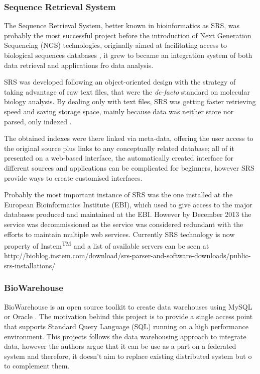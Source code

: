 \subsubsection{Sequence Retrieval System}
The Sequence Retrieval System, better known in bioinformatics as SRS, was probably the most successful project before the introduction of Next Generation Sequencing (NGS) technologies, originally aimed at facilitating access to biological sequences databases \cite{ETZ1996}, it grew to became an integration system of both data retrieval and applications fro data analysis.

SRS was developed following an object-oriented design with the strategy of taking advantage of raw text files, that were the \emph{de-facto} standard on molecular biology analysis. By dealing only with text files, SRS was getting faster retrieving speed and saving storage space, mainly because data was neither store nor parsed, only indexed \cite{ZDO2002}.

The obtained indexes were there linked via meta-data, offering the user access to the original source plus links to any conceptually related database; all of it presented on a web-based interface, the automatically created interface for different sources and applications can be complicated for beginners, however SRS provide ways to create customised interfaces.

Probably the most important instance of SRS was the one installed at the European Bioinformatics Institute (EBI), which used to give access to the major databases produced and maintained at the EBI. However by December 2013 the service was decommissioned as the service was considered redundant with the efforts to maintain multiple web services. Currently SRS technology is now property of Instem\textsuperscript{TM} and a list of available servers can be seen at http://bioblog.instem.com/download/srs-parser-and-software-downloads/public-srs-installations/


\subsubsection{BioWarehouse}
BioWarehouse is an open source toolkit to create data warehouses using MySQL or Oracle \cite{LEE2006}. The motivation behind this project is to provide  a single access point that supports Standard Query Language (SQL) running on a high performance environment.
This projects follows the data warehousing approach to integrate data, however the authors argue that it can be use as a part on a federated system and therefore, it doesn't aim to replace existing distributed system but o to complement them.

